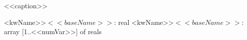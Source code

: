 \begin{algorithm}[h]
	\caption{<}
<<caption>>
	\SetAlgoLined
\end{algorithm}



    \<<kwName>>{$<<baseName>>$: real}
    \<<kwName>>{$<<baseName>>$: array [1..<<numVar>>] of reals}
